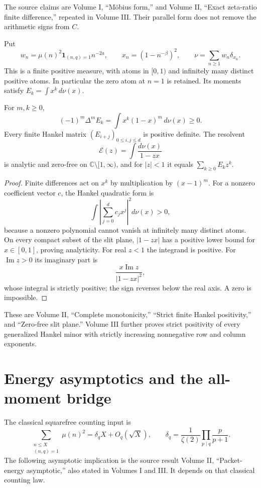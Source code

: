The source claims are Volume I, ``M\"obius form,'' and Volume II, ``Exact zeta-ratio finite difference,'' repeated in Volume III. Their parallel form does not remove the arithmetic signs from $C$.

Put
\[
w_n=\mu(n)^2\boldsymbol 1_{(n,q)=1}n^{-2a},
\qquad x_n=(1-n^{-\beta})^2,
\qquad \nu=\sum_{n\ge1}w_n\delta_{x_n}.
\]
This is a finite positive measure, with atoms in $[0,1)$ and infinitely many distinct positive atoms. In particular the zero atom at $n=1$ is retained. Its moments satisfy $E_k=\int x^k\,d\nu(x)$.

\begin{proposition}
For $m,k\ge0$,
\[
(-1)^m\Delta^mE_k=\int x^k(1-x)^m\,d\nu(x)\ge0.
\]
Every finite Hankel matrix $(E_{i+j})_{0\le i,j\le d}$ is positive definite. The resolvent
\[
\mathcal E(z)=\int\frac{d\nu(x)}{1-zx}
\]
is analytic and zero-free on $\mathbb C\setminus[1,\infty)$, and for $|z|<1$ it equals $\sum_{k\ge0}E_kz^k$.
\end{proposition}
\begin{proof}
Finite differences act on $x^k$ by multiplication by $(x-1)^m$. For a nonzero coefficient vector $c$, the Hankel quadratic form is
\[
\int\left|\sum_{j=0}^dc_jx^j\right|^2d\nu(x)>0,
\]
because a nonzero polynomial cannot vanish at infinitely many distinct atoms. On every compact subset of the slit plane, $|1-zx|$ has a positive lower bound for $x\in[0,1]$, proving analyticity. For real $z<1$ the integrand is positive. For $\operatorname{Im}z>0$ its imaginary part is
\[
\frac{x\operatorname{Im}z}{|1-zx|^2},
\]
whose integral is strictly positive; the sign reverses below the real axis. A zero is impossible.
\end{proof}

These are Volume II, ``Complete monotonicity,'' ``Strict finite Hankel positivity,'' and ``Zero-free slit plane.'' Volume III further proves strict positivity of every generalized Hankel minor with strictly increasing nonnegative row and column exponents.

\section{Energy asymptotics and the all-moment bridge}

The classical squarefree counting input is
\[
\sum_{\substack{n\le X\\(n,q)=1}}\mu(n)^2
=\delta_qX+O_q(\sqrt X),
\qquad
\delta_q=\frac1{\zeta(2)}\prod_{p\mid q}\frac{p}{p+1}.
\]
The following asymptotic implication is the source result Volume II, ``Packet-energy asymptotic,'' also stated in Volumes I and III. It depends on that classical counting law.


